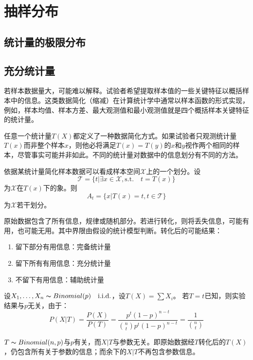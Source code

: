 \chapter{抽样分布}

\section{统计量的极限分布}





\section{充分统计量}

若样本数据量大，可能难以解释。试验者希望提取样本值的一些关键特征以概括样本中的信息。这类数据简化（缩减）在计算统计学中通常以样本函数的形式实现，例如，样本均值、样本方差、最大观测值和最小观测值就是四个概括样本关键特征的统计量。

任意一个统计量$T(X)$都定义了一种数据简化方式。如果试验者只观测统计量$T(x)$而非整个样本$x$，则他必将满足$T(x) = T(y)$的$x$和$y$视作两个相同的样本，尽管事实可能并非如此。不同的统计量对数据中的信息划分有不同的方法。

依据某统计量简化样本数据可以看成样本空间$\mathcal{X}$上的一个划分。设
\[ \mathcal{T}=\{t|\exists x \in \mathcal{X}, \text{s.t.} \quad  t=T(x) \} \]
为$\mathcal{X}$在$T(x)$下的象。则
\[ A_t=\{x|T(x)=t, t \in \mathcal{T}\} \]
为$\mathcal{X}$若干划分。

原始数据包含了所有信息，规律或随机部分。若进行转化，则将丢失信息，可能有用，也可能无用。其中界限由假设的统计模型判断。转化后的可能结果：
\begin{enumerate}
	\item 留下部分有用信息：完备统计量
	\item 留下所有有用信息：充分统计量
	\item 不留下有用信息：辅助统计量
\end{enumerate}

\begin{example}
	设$X_1,\dots,X_n \thicksim Binomial(p) \quad \text{i.i.d.} $，设$T(X)=\sum X_i$。
	若$T=t$已知，则实验结果与$p$无关，由于：
	$$P(X|T)=\frac{P(X)}{P(T)}=\frac{p^t(1-p)^{n-t}}{\binom{n}{t} p^t(1-p)^{n-t}}=\frac{1}{\binom{n}{t}}$$
\end{example}

\begin{remark}
	$T \thicksim Binomial(n,p)$与$p$有关，而$X|T$与参数无关。即原始数据经$T$转化后的$T(X)$，仍包含所有关于参数的信息；而余下的$X|T$不再包含参数信息。
\end{remark}

